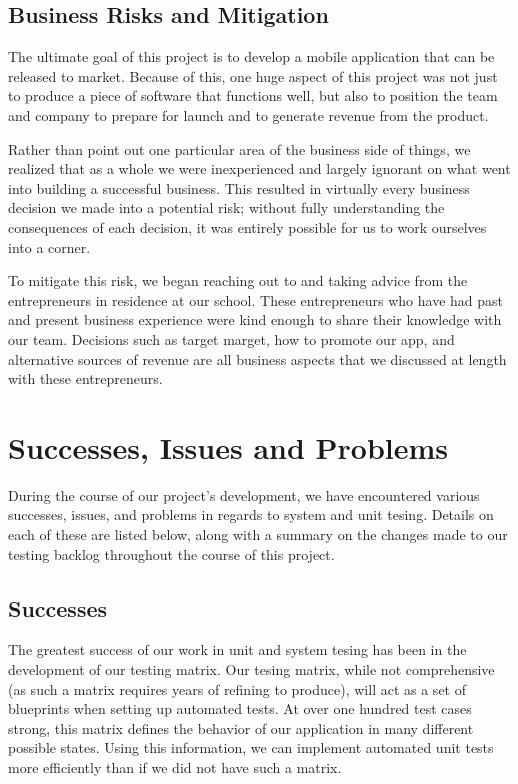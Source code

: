 \subsection{Business Risks and Mitigation}

The ultimate goal of this project is to develop a mobile application that can be
released to market. Because of this, one huge aspect of this project was not
just to produce a piece of software that functions well, but also to position
the team and company to prepare for launch and to generate revenue from the
product.

Rather than point out one particular area of the business side of things, we
realized that as a whole we were inexperienced and largely ignorant on what went
into building a successful business. This resulted in virtually every business
decision we made into a potential risk; without fully understanding the
consequences of each decision, it was entirely possible for us to work ourselves
into a corner.

To mitigate this risk, we began reaching out to and taking advice from the
entrepreneurs in residence at our school. These entrepreneurs who have had
past and present business experience were kind enough to share their knowledge
with our team. Decisions such as target marget, how to promote our app, and
alternative sources of revenue are all business aspects that we discussed at
length with these entrepreneurs.



\section{Successes, Issues and Problems}

During the course of our project's development, we have encountered various
successes, issues, and problems in regards to system and unit tesing. Details on
each of these are listed below, along with a summary on the changes made to our
testing backlog throughout the course of this project.


\subsection{Successes}

The greatest success of our work in unit and system tesing has been in the
development of our testing matrix. Our tesing matrix, while not comprehensive
(as such a matrix requires years of refining to produce), will act as a set of
blueprints when setting up automated tests. At over one hundred test cases
strong, this matrix defines the behavior of our application in many different
possible states. Using this information, we can implement automated unit tests
more efficiently than if we did not have such a matrix.

